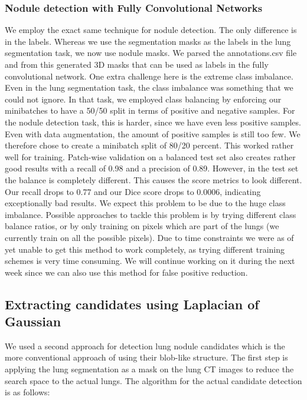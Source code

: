 \documentclass{article}
\begin{document}
\subsubsection{Nodule detection with Fully Convolutional Networks}
\label{sec:fcn}
We employ the exact same technique for nodule detection. The only difference is in the labels. Whereas we use the segmentation masks as the labels in the lung segmentation task, we now use nodule masks. We parsed the annotations.csv file and from this generated 3D masks that can be used as labels in the fully convolutional network. One extra challenge here is the extreme class imbalance. Even in the lung segmentation task, the class imbalance was something that we could not ignore. In that task, we employed class balancing by enforcing our minibatches to have a 50/50 split in terms of positive and negative samples. For the nodule detection task, this is harder, since we have even less positive samples. Even with data augmentation, the amount of positive samples is still too few. We therefore chose to create a minibatch split of 80/20 percent. This worked rather well for training. Patch-wise validation on a balanced test set also creates rather good results with a recall of 0.98 and a precision of 0.89. However, in the test set the balance is completely different. This causes the score metrics to look different. Our recall drops to 0.77 and our Dice score drops to 0.0006, indicating exceptionally bad results. We expect this problem to be due to the huge class imbalance. Possible approaches to tackle this problem is by trying different class balance ratios, or by only training on pixels which are part of the lungs (we currently train on all the possible pixels). Due to time constraints we were as of yet unable to get this method to work completely, as trying different training schemes is very time consuming. We will continue working on it during the next week since we can also use this method for false positive reduction. 

\subsection{Extracting candidates using Laplacian of Gaussian}
We used a second approach for detection lung nodule candidates which is the more conventional approach of using their blob-like structure. The first step is applying the lung segmentation as a mask on the lung CT images to reduce the search space to the actual lungs. The algorithm for the actual candidate detection is as follows:
\end{document}
